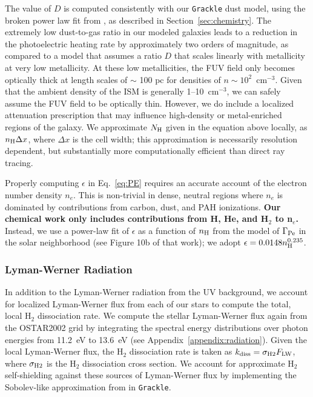 \documentclass[fleqn,usenatbib,useAMS]{mnras}
\newcommand{\ccunit}{cm$^{-3}$}
\begin{document}
The value of $D$ is computed consistently with our \texttt{Grackle} dust model, using the broken power law fit from \citet{Remy-Ruyer2014}, as described in Section~\ref{sec:chemistry}. The extremely low dust-to-gas ratio in our modeled galaxies leads to a reduction in the photoelectric heating rate by approximately two orders of magnitude, as compared to a model that assumes a ratio $D$ that scales linearly with metallicity at very low metallicity. At these low metallicities, the FUV field only becomes optically thick at length scales of $\sim$ 100 pc for densities of $n \sim 10^2$~\ccunit. Given that the ambient density of the ISM is generally 1--10~cm$^{-3}$, we can safely assume the FUV field to be optically thin. However, we do include a localized attenuation prescription that may influence high-density or metal-enriched regions of the galaxy. We approximate $N_{\rm H}$ given in the equation above locally, as $n_{\rm H}\Delta x$, where $\Delta x$ is the cell width; this approximation is necessarily resolution dependent, but substantially more computationally efficient than direct ray tracing.

Properly computing $\epsilon$ in Eq.~\ref{eq:PE} requires an accurate account of the electron number density $n_e$. This is non-trivial in dense, neutral regions where $n_e$ is dominated by contributions from carbon, dust, and PAH ionizations. \textbf{Our chemical work only includes contributions from H, He, and H$_2$ to n$_e$.} Instead, we use a power-law fit of $\epsilon$ as a function of $n_{\rm H}$ from the \citet{Wolfire2003} model of $\Gamma_{\rm{Pe}}$ in the solar neighborhood (see Figure 10b of that work); we adopt $\epsilon = 0.0148n_{\rm{H}}^{0.235}$. %

\subsubsection{Lyman-Werner Radiation}
\label{sec:LW}
In addition to the Lyman-Werner radiation from the UV background, we account for localized Lyman-Werner flux from each of our stars to compute the total, local H$_2$ dissociation rate. We compute the stellar Lyman-Werner flux again from the OSTAR2002 grid by integrating the spectral energy distributions over photon energies from 11.2~eV to 13.6~eV (see Appendix~\ref{appendix:radiation}). Given the local Lyman-Werner flux, the H$_2$ dissociation rate is taken as $k_{\rm diss} = \sigma_{\rm H2} F_{\rm LW}$, where $\sigma_{\rm H2}$ is the H$_2$ dissociation cross section. We account for approximate H$_2$ self-shielding against these sources of Lyman-Werner flux by implementing the Sobolev-like approximation from \citet{Wolcott-Green2011} in \texttt{Grackle}. 
\end{document}
